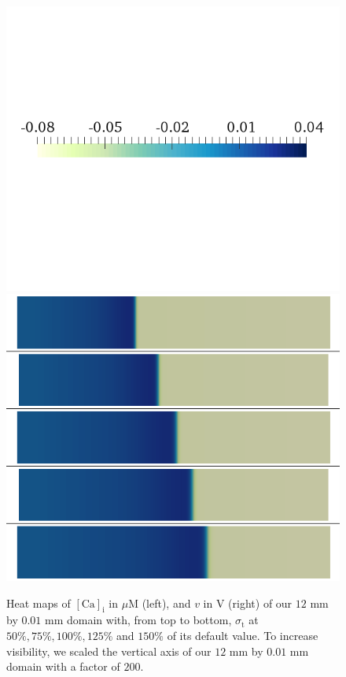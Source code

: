 \documentclass{article}
\begin{document}
\begin{figure}
\begin{minipage}{0.5\textwidth}
\includegraphics[trim=0cm 7cm 0cm 6cm, clip=true, width=1\linewidth]{legend_v2}
\includegraphics[trim=0cm 0cm 0cm 0cm, clip=true, width=1\linewidth]{v_sigma}
    \end{minipage}
    \caption{Heat maps of $[\mathrm{Ca}]_{\mathrm{i}}$ in $\mu$M (left), and $v$ in V (right) of our $12$ mm by $0.01$ mm domain with, from top to bottom, $\sigma_{\mathrm{t}}$ at $50\%, 75\%, 100\%, 125\%$ and $150\%$ of its default value. To increase visibility, we scaled the vertical axis of our $12$ mm by $0.01$ mm domain with a factor of $200$.}
    \label{fig:1e}
\end{figure}
%
%
\end{document}
